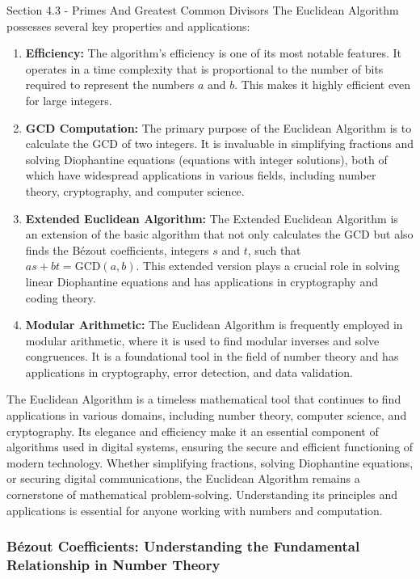 \begin{notes}{Section 4.3 - Primes And Greatest Common Divisors}
    The Euclidean Algorithm possesses several key properties and applications:

    \begin{enumerate}
        \item \textbf{Efficiency:} The algorithm's efficiency is one of its most notable features. It operates in a time complexity that is proportional to the number of bits required to represent the 
        numbers $a$ and $b$. This makes it highly efficient even for large integers.
        \item \textbf{GCD Computation:} The primary purpose of the Euclidean Algorithm is to calculate the GCD of two integers. It is invaluable in simplifying fractions and solving Diophantine equations 
        (equations with integer solutions), both of which have widespread applications in various fields, including number theory, cryptography, and computer science.
        \item \textbf{Extended Euclidean Algorithm:} The Extended Euclidean Algorithm is an extension of the basic algorithm that not only calculates the GCD but also finds the Bézout coefficients, 
        integers $s$ and $t$, such that $as + bt = \text{GCD}(a, b)$. This extended version plays a crucial role in solving linear Diophantine equations and has applications in cryptography and coding theory.
        \item \textbf{Modular Arithmetic:} The Euclidean Algorithm is frequently employed in modular arithmetic, where it is used to find modular inverses and solve congruences. It is a foundational 
        tool in the field of number theory and has applications in cryptography, error detection, and data validation.
    \end{enumerate}
    
    The Euclidean Algorithm is a timeless mathematical tool that continues to find applications in various domains, including number theory, computer science, and cryptography. Its elegance and 
    efficiency make it an essential component of algorithms used in digital systems, ensuring the secure and efficient functioning of modern technology. Whether simplifying fractions, solving Diophantine 
    equations, or securing digital communications, the Euclidean Algorithm remains a cornerstone of mathematical problem-solving. Understanding its principles and applications is essential for anyone working 
    with numbers and computation.

    \subsubsection*{Bézout Coefficients: Understanding the Fundamental Relationship in Number Theory}


\end{notes}
